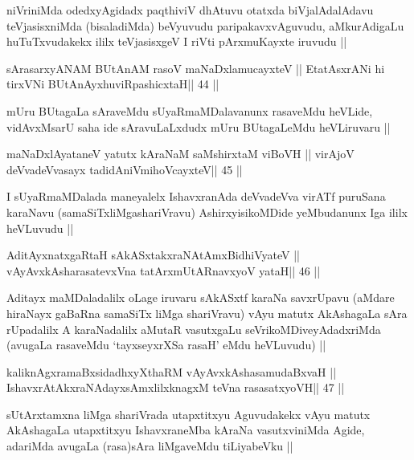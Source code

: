 \begin{artha}
niVriniMda odedxyAgidadx paqthiviV dhAtuvu otatxda biVjalAdalAdavu
teVjasisxniMda (bisaladiMda) beVyuvudu paripakavxvAguvudu,
aMkurAdigaLu huTuTxvudakekx ililx teVjasisxgeV I riVti pArxmuKayxte
iruvudu ||
\end{artha}

\begin{shl}
sArasarxyANAM BUtAnAM rasoV maNaDxlamucayxteV ||
EtatAsxrANi hi tirxVNi BUtAnAyxhuviRpashicxtaH\hfill || 44 ||
\end{shl}

\begin{artha}
mUru BUtagaLa sAraveMdu sUyaRmaMDalavanunx rasaveMdu heVLide,
vidAvxMsarU saha ide sAravuLaLxdudx mUru BUtagaLeMdu heVLiruvaru ||
\end{artha}

\begin{shl}
maNaDxlAyataneV yatutx kAraNaM saMshirxtaM viBoVH ||
virAjoV deVvadeVvasayx tadidAniVmihoVcayxteV\hfill || 45 ||
\end{shl}

\begin{artha}
I sUyaRmaMDalada maneyalelx IshavxranAda deVvadeVva virATf puruSana
karaNavu (samaSiTxliMgashariVravu) AshirxyisikoMDide yeMbudanunx Iga
ililx heVLuvudu ||
\end{artha}

\begin{shl}
AditAyxnatxgaRtaH sAkASxtakxraNAtAmx\s BidhiVyateV ||
vAyAvxkAsharasatevxVna tatArxmUtARnavxyoV yataH\hfill || 46 ||
\end{shl}

\begin{artha}
Aditayx maMDaladalilx oLage iruvaru sAkASxtf karaNa savxrUpavu (aMdare
hiraNayx gaBaRna samaSiTx liMga shariVravu) vAyu matutx AkAshagaLa
sAra rUpadalilx A karaNadalilx aMutaR vasutxgaLu
seVrikoMDiveyAdadxriMda (avugaLa rasaveMdu `tayxseyxrXSa rasaH' eMdu
heVLuvudu) ||
\end{artha}

\begin{shl}
kaliknAgxramaBxsidadhxyXthaRM vAyAvxkAshasamudaBxvaH ||
IshavxrAtAkxraNAdayxsAmxlilxknagxM teVna rasasatxyoVH\hfill || 47 ||
\end{shl}

\begin{artha}
sUtArxtamxna liMga shariVrada utapxtitxyu Aguvudakekx vAyu matutx
AkAshagaLa utapxtitxyu IshavxraneMba kAraNa vasutxviniMda Agide,
adariMda avugaLa (rasa)sAra liMgaveMdu tiLiyabeVku ||
\end{artha}

